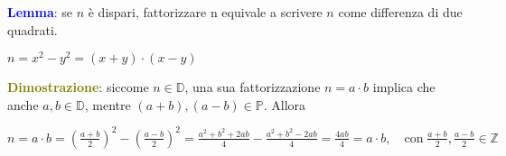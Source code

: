 \begin{flushleft}
    \textcolor{blue}{\textbf{Lemma}}: se $n$ è dispari, fattorizzare n equivale a scrivere $n$ come differenza di due quadrati.

    {\centering
        $n = x^2 - y^2 = (x + y) \cdot (x - y)$
    \par}
    \begin{boxA}
        \textcolor{olive}{\textbf{Dimostrazione}}: siccome $n \in \mathbb{D}$, una sua fattorizzazione $n = a \cdot b$ implica che anche $a, b \in \mathbb{D}$, mentre $(a+b), (a-b) \in \mathbb{P}$. Allora 

        {\centering
            $n = a \cdot b = (\frac{a + b}{2})^2 - (\frac{a - b}{2})^2 = \frac{a^2 + b^2 + 2ab}{4} - \frac{a^2 + b^2 - 2ab}{4} = \frac{4ab}{4} = a \cdot b, \quad \text{con} \; \frac{a + b}{2}, \frac{a - b}{2} \in \mathbb{Z}$
        \par}

    \end{boxA}
\end{flushleft}


